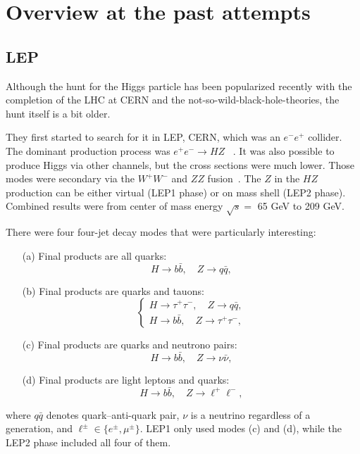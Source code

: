 \section{Overview at the past attempts}

\subsection{LEP}

Although the hunt for the Higgs particle has been popularized recently with the completion of the LHC at CERN and the
\hbox{not-so-wild-black-hole-theories,} the hunt itself is a bit older.

They first started to search for it in LEP, CERN, which was an $e^-e^+$ collider. The dominant production process was $e^+e^-\to HZ$
~\cite{higgs:review}.
It was also possible to produce Higgs via other channels, but the cross sections were much lower. Those modes were secondary via
the $W^+W^-$ and $ZZ$ fusion~\cite{higgs:review}. The $Z$ in the $HZ$ production can be either virtual (LEP1 phase) or on mass shell
(LEP2 phase). Combined results were from center of mass energy $\sqrt{s} =$ 65 GeV to 209 GeV.

There were four four-jet decay modes that were particularly interesting:

\begin{itemize}
	\item[(a)] Final products are all quarks:
		\[ H \to b\bar{b}, \quad Z \to q\bar{q}, \] \vspace{-32pt}
	\item[(b)] Final products are quarks and tauons:
		\[ \left\{\begin{matrix}
		H \to \tau^+\tau^-, \quad Z \to q\bar{q}, \\
		H \to b\bar{b}, \quad Z \to \tau^+\tau^-,
		\end{matrix}\right.\] \vspace{-22pt}
	\item[(c)] Final products are quarks and neutrono pairs:
		\[ H \to b\bar{b}, \quad Z \to \nu\bar{\nu}, \] \vspace{-32pt}
	\item[(d)] Final products are light leptons and quarks:
		\[ H \to b\bar{b}, \quad Z \to \ell^+\ell^-, \] \vspace{-32pt} \label{higgs:decay}
\end{itemize}

where $q\bar{q}$ denotes quark--anti-quark pair, $\nu$ is a neutrino regardless of a generation, and $\ell^\pm \in \{e^\pm,\mu^\pm\}$.
LEP1 only used modes (c) and (d), while the LEP2 phase included all four of them.

